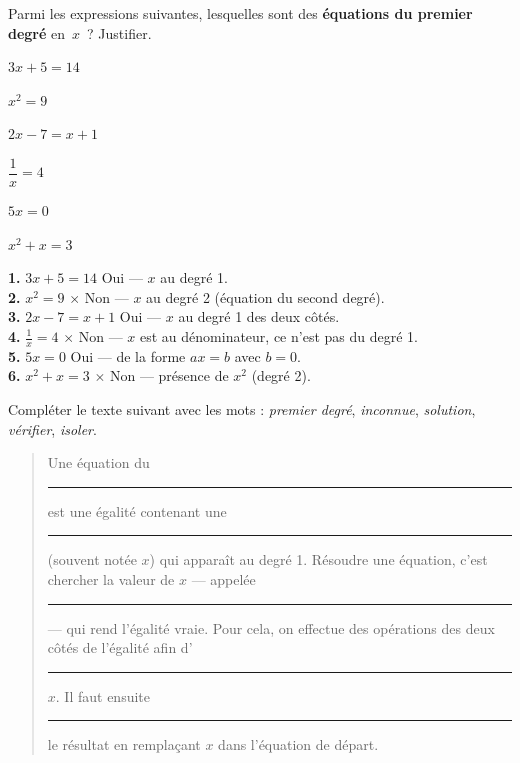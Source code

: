 \documentclass[a4paper,11pt]{article}
\begin{document}
\vspace{6pt}

\begin{question}
Parmi les expressions suivantes, lesquelles sont des \textbf{équations du premier degré} en~$x$~? Justifier.

\medskip
\begin{enumerate*}[label=\textbf{\arabic*.}\;,itemjoin=\qquad]
  \item $3x + 5 = 14$
  \item $x^2 = 9$
  \item $2x - 7 = x + 1$
  \item $\dfrac{1}{x} = 4$
  \item $5x = 0$
  \item $x^2 + x = 3$
\end{enumerate*}
\end{question}

\begin{correction}
\textbf{1.} $3x + 5 = 14$ \;\checkmark\; Oui — $x$ au degré 1.\\
\textbf{2.} $x^2 = 9$ \;$\boldsymbol{\times}$\; Non — $x$ au degré 2 (équation du second degré).\\
\textbf{3.} $2x - 7 = x + 1$ \;\checkmark\; Oui — $x$ au degré 1 des deux côtés.\\
\textbf{4.} $\frac{1}{x} = 4$ \;$\boldsymbol{\times}$\; Non — $x$ est au dénominateur, ce n'est pas du degré 1.\\
\textbf{5.} $5x = 0$ \;\checkmark\; Oui — de la forme $ax = b$ avec $b = 0$.\\
\textbf{6.} $x^2 + x = 3$ \;$\boldsymbol{\times}$\; Non — présence de $x^2$ (degré 2).
\end{correction}

\vspace{6pt}

\begin{question}
Compléter le texte suivant avec les mots : \textit{premier degré}, \textit{inconnue}, \textit{solution}, \textit{vérifier}, \textit{isoler}.

\medskip
\begin{quote}
\og Une équation du \rule{2.5cm}{0.4pt} est une égalité contenant une \rule{2.5cm}{0.4pt} (souvent notée $x$) qui apparaît au degré 1. Résoudre une équation, c'est chercher la valeur de $x$ — appelée \rule{2.5cm}{0.4pt} — qui rend l'égalité vraie. Pour cela, on effectue des opérations des deux côtés de l'égalité afin d'\rule{2.5cm}{0.4pt} $x$. Il faut ensuite \rule{2.5cm}{0.4pt} le résultat en remplaçant $x$ dans l'équation de départ. \fg
\end{quote}
\end{question}
\end{document}
